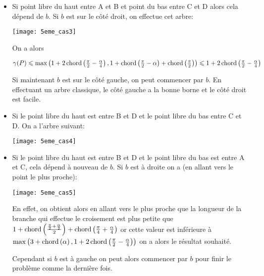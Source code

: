 \begin{itemize}
\begin{itemize}
\item \label{5cas22} Si point libre du haut entre A et B et point du bas entre C et D alors cela dépend de $b$. Si $b$ est sur le côté droit, on effectue cet arbre:

  \texttt{[image: 5eme\_cas3]}\label{fig:5eme_cas3}

On a alors

$\gamma(P) \leqslant \max\left(1+2\operatorname{chord}\left(\frac{\pi}{2} - \frac{\alpha}{4}\right), 1 + \operatorname{chord}\left(\frac{\pi}{2} - \alpha\right) + \operatorname{chord}\left(\frac{\pi}{2}\right)\right) \leqslant 1+2\operatorname{chord}\left(\frac{\pi}{2} - \frac{\alpha}{4}\right)$

Si maintenant $b$ est sur le côté gauche, on peut commencer par $b$. En effectuant un arbre classique, le côté gauche a la bonne borne et le côté droit est facile.

\item \label{5cas23} Si le point libre du haut est entre B et D et le point libre du bas entre C et D. On a l'arbre suivant:

  \texttt{[image: 5eme\_cas4]}\label{fig:5eme_cas4}

\item \label{5cas24} Si le point libre du haut est entre B et D et le point libre du bas est entre A et C, cela dépend à nouveau de $b$. Si $b$ est à droite on a (en allant vers le point le plus proche):

  \texttt{[image: 5eme\_cas5]}\label{fig:5eme_cas5}

En effet, on obtient alors en allant vers le plus proche que la longueur de la branche qui effectue le croisement est plus petite que $1+\operatorname{chord}\left(\frac{\frac{\pi}{2} + \frac{\alpha}{2}}{2}\right) + \operatorname{chord}\left(\frac{\pi}{4} + \frac{\alpha}{4}\right)$ or cette valeur est inférieure à $\max\left(3 + \operatorname{chord}\left(\alpha\right), 1 + 2\operatorname{chord}\left(\frac{\pi}{2} - \frac{\alpha}{4}\right)\right)$ on a alors le résultat souhaité.

Cependant si $b$ est à gauche on peut alors commencer par $b$ pour finir le problème comme la dernière fois.

\end{itemize}
\end{itemize}

